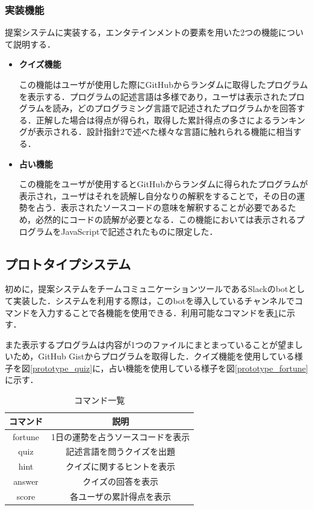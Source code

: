 \subsubsection{実装機能}
提案システムに実装する，エンタテインメントの要素を用いた2つの機能について説明する．
\begin{itemize}
  \item {\bf クイズ機能}

  この機能はユーザが使用した際にGitHubからランダムに取得したプログラムを表示する．プログラムの記述言語は多様であり，ユーザは表示されたプログラムを読み，どのプログラミング言語で記述されたプログラムかを回答する．正解した場合は得点が得られ，取得した累計得点の多さによるランキングが表示される．設計指針2で述べた様々な言語に触れられる機能に相当する．

  \item {\bf 占い機能}

  この機能をユーザが使用するとGitHubからランダムに得られたプログラムが表示され，ユーザはそれを読解し自分なりの解釈をすることで，その日の運勢を占う．表示されたソースコードの意味を解釈することが必要であるため，必然的にコードの読解が必要となる．この機能においては表示されるプログラムをJavaScriptで記述されたものに限定した．

\end{itemize}

\subsection{プロトタイプシステム}
初めに，提案システムをチームコミュニケーションツールであるSlackのbotとして実装した．システムを利用する際は，このbotを導入しているチャンネルでコマンドを入力することで各機能を使用できる．利用可能なコマンドを表\ref{function}に示す．

また表示するプログラムは内容が1つのファイルにまとまっていることが望ましいため，GitHub Gistからプログラムを取得した．クイズ機能を使用している様子を図\ref{prototype_quiz}に，占い機能を使用している様子を図\ref{prototype_fortune}に示す．

\begin{table}[!ht]
  \centering
    \caption{コマンド一覧}
      \begin{tabular}{|c|c|} \hline
        コマンド & 説明 \\ \hline \hline
        fortune & 1日の運勢を占うソースコードを表示 \\ \hline
        quiz & 記述言語を問うクイズを出題 \\ \hline
        hint & クイズに関するヒントを表示 \\ \hline
        answer & クイズの回答を表示 \\ \hline
        score & 各ユーザの累計得点を表示 \\ \hline
      \end{tabular}
    \label{function}
  \end{table}

